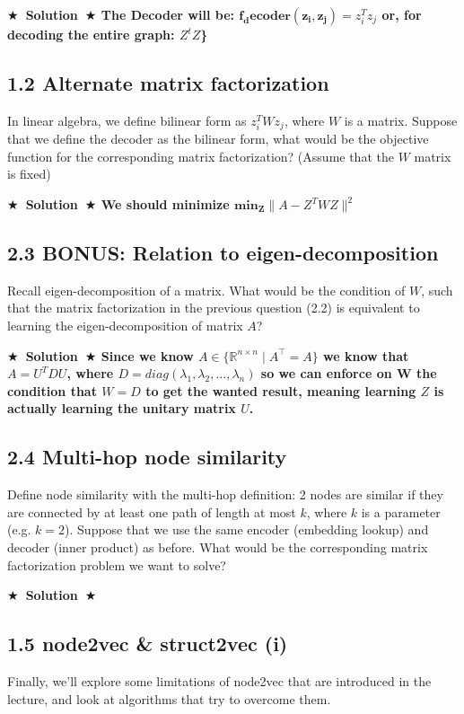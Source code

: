 \documentclass{article}
\newcommand{\Solution}[1]{{\medskip \color{red} \bf $\bigstar$~\sf \textbf{Solution}~$\bigstar$ \sf #1 } \bigskip}
\begin{document}
\Solution{The Decoder will be: $\mathbf{{f}_decoder(z_i,z_j)}=z_i^Tz_j$  or, for decoding the entire graph: $Z^tZ$\}

\subsection*{1.2 Alternate matrix factorization}

In linear algebra, we define bilinear form as $z_i^T W z_j$, where $W$ is a matrix. Suppose that we define the decoder as the bilinear form, what would be the objective function for the corresponding matrix factorization? (Assume that the $W$ matrix is fixed)

\Solution{We should minimize $\mathbf{min_Z}\|A-Z^T WZ\|^2$

\subsection*{2.3 BONUS: Relation to eigen-decomposition}

Recall eigen-decomposition of a matrix. What would be the condition of $W$, such that the matrix factorization in the previous question (2.2) is equivalent to learning the eigen-decomposition of matrix $A$?

\Solution{Since we know ${A∈\{\mathbb R^{n\times n} ∣A ^⊤ =A\}} $  we know that $A=U^TDU$, where ${D=diag(\lambda_1,\lambda_2,...,\lambda_n)}$ so we can enforce on W the condition that $W=D$ to get the wanted result, meaning learning $Z$ is actually learning the unitary matrix $U$.

\subsection*{2.4 Multi-hop node similarity}

Define node similarity with the multi-hop definition: 2 nodes are similar if they are connected by at least one path of length at most $k$, where $k$ is a parameter (e.g. $k = 2$). Suppose that we use the same encoder (embedding lookup) and decoder (inner product) as before. What would be the corresponding matrix factorization problem we want to solve?

\Solution{}

\subsection*{1.5 node2vec \& struct2vec (i)}

Finally, we’ll explore some limitations of node2vec that are introduced in the lecture, and look at algorithms that try to overcome them.

}}}
\end{document}
